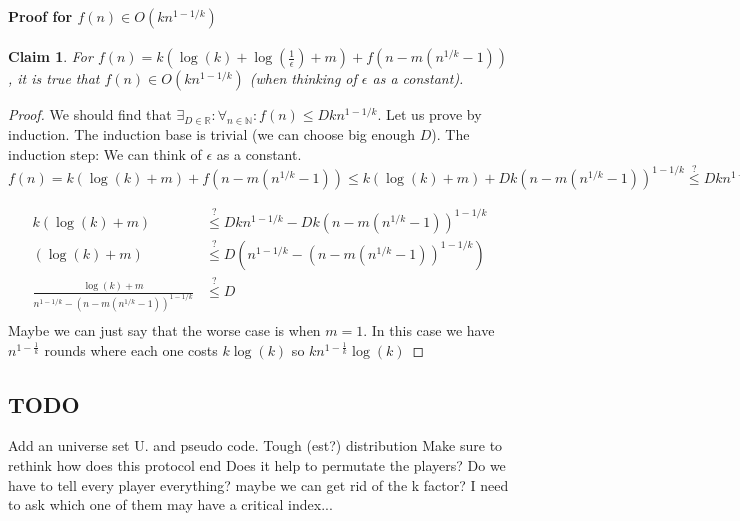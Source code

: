 \documentclass{article}
\theoremstyle{plain}
\newtheorem{claim}{Claim}
\begin{document}
\paragraph{Proof for $f(n) \in O(kn^{1-1/k})$}
\begin{claim} 
For $f(n) = k(\log(k) + \log(\frac{1}{\epsilon}) + m) + f(n - m(n^{1/k} - 1))$, it is true that $f(n) \in O(kn^{1-1/k})$ (when thinking of $\epsilon$ as a constant). \newline
\end{claim}
\begin{proof}
We should find that $ \exists_{D\in\mathbb{R}} : \forall_{n \in \mathbb{N}} : f(n) \leq Dkn^{1-1/k}$. Let us prove by induction. The induction base is trivial (we can choose big enough $D$). The induction step: \newline
We can think of $\epsilon$ as a constant. \newline
$f(n) = k(\log(k) + m) + f(n - m(n^{1/k} - 1)) \leq k(\log(k) + m) + Dk(n - m(n^{1/k} - 1))^{1-1/k} \overset{?}{\leq} Dkn^{1-1/k}$ \newline

\begin{align*}
  k(\log(k) + m) &\overset{?}{\leq} Dkn^{1-1/k} -  Dk(n - m(n^{1/k} - 1))^{1-1/k}\\
  (\log(k) + m) &\overset{?}{\leq} D(n^{1-1/k} -  (n - m(n^{1/k} - 1))^{1-1/k})\\
  \frac{\log(k) + m}{n^{1-1/k} -  (n - m(n^{1/k} - 1))^{1-1/k}} & \overset{?}{\leq} D \\
\end{align*}
\newline
Maybe we can just say that the worse case is when $m = 1$.
In this case we have $n^{1-\frac{1}{k}}$ rounds where each one costs $k\log(k)$ so $kn^{1-\frac{1}{k}}\log(k)$
\end{proof}

\subsection{TODO}
Add an universe set U. and pseudo code. 
Tough (est?) distribution\newline
Make sure to rethink how does this protocol end \newline
Does it help to permutate the players? \newline
Do we have to tell every player everything? maybe we can get rid of the k factor? I need to ask which one of them may have a critical index... \newline
\end{document}
